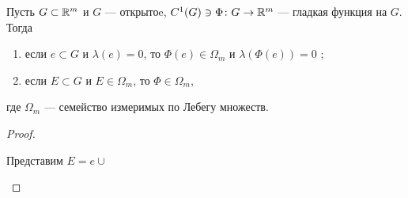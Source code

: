 \begin{thm}
    Пусть $ G \subset \mathbb{R}^{m}$ и $ G$ --- открытоe,  $ C^{1}(G) \ni \Phi\colon G \to \mathbb{R}^{m} $ --- гладкая функция на $ G$.
    Тогда
     \begin{enumerate}[noitemsep,label=(\arabic*),noitemsep]
	 \item  если  $ e \subset G$ и $ \lambda (e) = 0$, то $ \Phi(e) \in \Omega _{m}$ и $ \lambda (\Phi(e)) = 0$ ;
        \item если $ E \subset G$ и $ E \in \Omega _{m}$, то $ \Phi \in \Omega _{m}$,
    \end{enumerate} 
    где $ \Omega _{m}$ --- семейство измеримых по Лебегу множеств.
\end{thm}
\begin{proof}
    $ $
    \begin{description}
        \item {} 
	    Представим $ E = e \cup $
        \item {} 
    \end{description} 
\end{proof}

